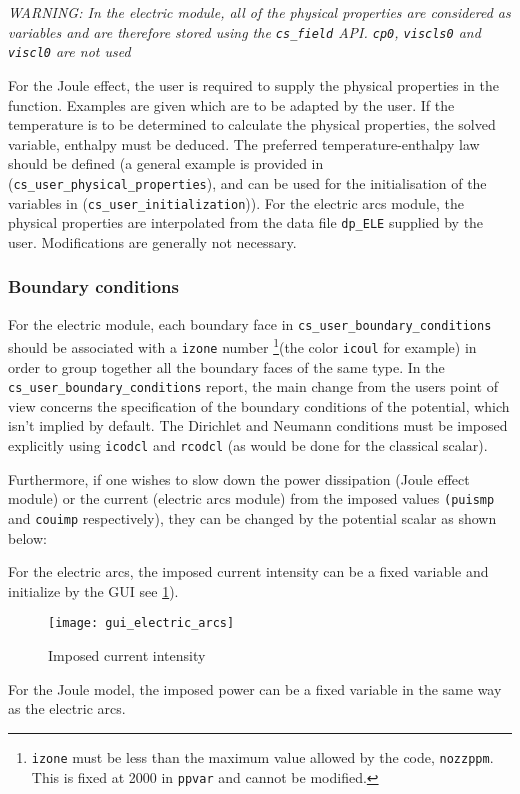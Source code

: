 {\em WARNING: In the electric module, all of the physical properties are considered as variables
 and are therefore stored using the \texttt{cs\_field} API. \texttt{cp0}, \texttt{viscls0} and \texttt{viscl0}
 are not used}

For the Joule effect, the user is required to supply the physical properties in the
function. Examples are given which are to be adapted by the user. If the temperature is
to be determined to calculate the physical properties, the solved variable, enthalpy must
 be deduced. The preferred temperature-enthalpy law should be defined
 (a general example is provided in (\texttt{cs\_user\_physical\_properties}),
 and can be used for the initialisation of the variables in
 (\texttt{cs\_user\_initialization})).
 For the electric arcs module, the physical properties are interpolated from the data file
 \texttt{dp\_ELE} supplied by the user. Modifications are generally not necessary.

\subsubsection{Boundary conditions}

For the electric module, each boundary face in \texttt{cs\_user\_boundary\_conditions} should be associated with a
 \texttt{izone} number \footnote{\texttt{izone} must be less than the maximum
 value allowed by the code, \texttt{nozzppm}. This is fixed at 2000 in \texttt
{ppvar} and cannot be modified.}(the color \texttt{icoul} for example) in
 order to group together all the boundary faces of the same type. In the
 \texttt{cs\_user\_boundary\_conditions} report, the main change from the users point of view concerns the
 specification of the boundary conditions of the potential, which isn't
 implied by default. The Dirichlet and Neumann conditions must be imposed
 explicitly using \texttt{icodcl} and \texttt{rcodcl} (as would be done for
 the classical scalar).

Furthermore, if one wishes to slow down the power dissipation (Joule
effect module) or the current (electric arcs module) from the imposed values
\texttt{(puismp} and \texttt{couimp} respectively),
 they can be changed by the potential scalar as shown below:

\begin{list}{-}{}
\item For the electric arcs, the imposed current intensity can be a fixed variable and initialize by the GUI see
\figurename\ref{fig:electric_arcs}).

\begin{figure}[ht]
\begin{center}
\texttt{[image: gui\_electric\_arcs]}
\caption{Imposed current intensity}
\label{fig:electric_arcs}
\end{center}
\end{figure}

\item For the Joule model, the imposed power  can be a fixed variable in the same way as the electric arcs.
\end{list}

